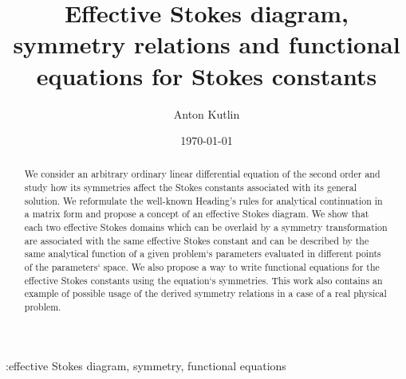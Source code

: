 \documentclass[12pt]{iopart}
\begin{document}
\title[Effective Stokes diagram, symmetries and functional equations for Stokes constants]{Effective Stokes diagram, symmetry relations and functional equations for Stokes constants}
\author{Anton Kutlin}

\address{Institute of Applied Physics of Russian Academy of Sciences, 46 Ulyanov str., 603950 Nizhny Novgorod, Russia}


\date{\today}

\begin{abstract}
We consider an arbitrary ordinary linear differential equation of the second order and study how its symmetries affect the Stokes constants associated with its general solution. We reformulate the well-known Heading's rules for analytical continuation in a matrix form and propose a concept of an effective Stokes diagram. We show that each two effective Stokes domains which can be overlaid by a symmetry transformation are associated with the same effective Stokes constant and can be described by the same analytical function of a given problem`s parameters evaluated in different points of the parameters` space. We also propose a way to write functional equations for the effective Stokes constants using the equation`s symmetries. This work also contains an example of possible usage of the derived symmetry relations in a case of a real physical problem. 
\end{abstract}

\submitto{\jpa}

:effective Stokes diagram, symmetry, functional equations

\end{document}

